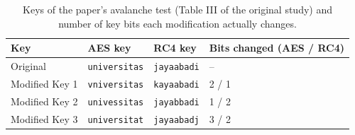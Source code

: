 \begin{table}[htbp]
\centering
\caption{Keys of the paper's avalanche test (Table III of the original study) and number of key bits each modification actually changes.}
\label{tab:p3_keys}
\small
\begin{tabular}{llll}
\toprule
\textbf{Key} & \textbf{AES key} & \textbf{RC4 key} & \textbf{Bits changed (AES / RC4)} \\
\midrule
Original & \texttt{universitas} & \texttt{jayaabadi} & -- \\
Modified Key 1 & \texttt{vniversitas} & \texttt{kayaabadi} & 2 / 1 \\
Modified Key 2 & \texttt{univessitas} & \texttt{jayabbadi} & 1 / 2 \\
Modified Key 3 & \texttt{universitat} & \texttt{jayaabadj} & 3 / 2 \\
\bottomrule
\end{tabular}
\end{table}
